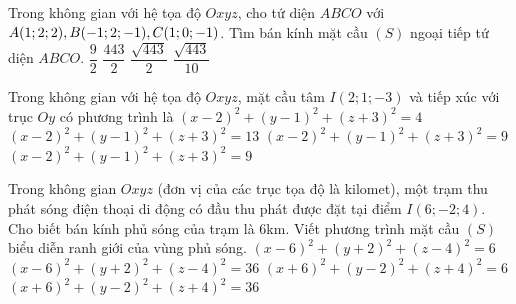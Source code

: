 \begin{ex}%
	Trong không gian với hệ tọa độ $Oxyz$, cho tứ diện $ABCO$ với $A(1;2;2)\\
	,B(-1;2;-1), C(1;0;-1)$. Tìm bán kính mặt cầu $(S)$ ngoại tiếp tứ diện $ABCO$.
	\choice
	{$\dfrac{9}{2}$}
	{$\dfrac{443}{2}$}
	{$\dfrac{\sqrt{443}}{2}$}
	{\True $\dfrac{\sqrt{443}}{10}$}
\end{ex}

\begin{ex}%
	Trong không gian với hệ tọa độ $Oxyz$, mặt cầu tâm $I(2;1;-3)$ và tiếp xúc với trục $Oy$ có phương trình là
	\choice
	{$(x-2)^2+(y-1)^2+(z+3)^2=4$}
	{\True $(x-2)^2+(y-1)^2+(z+3)^2=13$}
	{$(x-2)^2+(y-1)^2+(z+3)^2=9$}
	{$(x-2)^2+(y-1)^2+(z+3)^2=9$}
\end{ex}

\begin{ex}%
	Trong không gian $Oxyz$ (đơn vị của các trục tọa độ là kilomet), một trạm thu phát sóng điện thoại di động có đầu thu phát được đặt tại điểm $I(6;-2;4)$. Cho biết bán kính phủ sóng của trạm là $6$km. Viết phương trình mặt cầu $(S)$ biểu diễn ranh giới của vùng phủ sóng.
	\choice
	{$(x-6)^2+(y+2)^2+(z-4)^2=6$}
	{\True $(x-6)^2+(y+2)^2+(z-4)^2=36$}
	{$(x+6)^2+(y-2)^2+(z+4)^2=6$}
	{$(x+6)^2+(y-2)^2+(z+4)^2=36$}
\end{ex}

